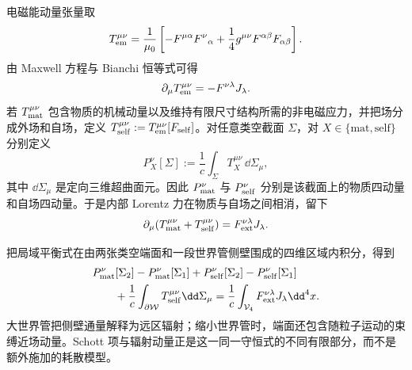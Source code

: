 \begin{proposition}[物质与自场的局域守恒]
电磁能动量张量取
\begin{equation}
 T_{\rm em}^{\mu\nu}
 =\frac1{\mu_0}
 \left[-F^{\mu\alpha}F^\nu{}_{\alpha}
 +\frac14g^{\mu\nu}F^{\alpha\beta}F_{\alpha\beta}\right].
 \label{eq:phys-rr-em-stress-energy}
\end{equation}
由 Maxwell 方程与 Bianchi 恒等式可得
\[
 \partial_\mu T_{\rm em}^{\mu\nu}=-F^{\nu\lambda}J_\lambda.
\]
若 \(T_{\rm mat}^{\mu\nu}\) 包含物质的机械动量以及维持有限尺寸结构所需的非电磁应力，并把场分成外场和自场，定义 \(T_{\rm self}^{\mu\nu}:=T_{\rm em}^{\mu\nu}[F_{\rm self}]\)。对任意类空截面 \(\Sigma\)，对 \(X\in\{\mathrm{mat},\mathrm{self}\}\) 分别定义
\[
 P_X^{\nu}[\Sigma]
 :=\frac1c\int_{\Sigma}T_X^{\mu\nu}\,\dd\Sigma_\mu,
\]
其中 \(\dd\Sigma_\mu\) 是定向三维超曲面元。因此 \(P_{\rm mat}^{\nu}\) 与 \(P_{\rm self}^{\nu}\) 分别是该截面上的物质四动量和自场四动量。于是内部 Lorentz 力在物质与自场之间相消，留下
\begin{equation}
 \partial_\mu\!
 \left(T_{\rm mat}^{\mu\nu}+T_{\rm self}^{\mu\nu}\right)
 =F_{\rm ext}^{\nu\lambda}J_\lambda .
 \label{eq:phys-rr-exact-self-balance}
\end{equation}
\end{proposition}
把局域平衡式在由两张类空端面和一段世界管侧壁围成的四维区域内积分，得到
\begin{align}
 &P_{\rm mat}^\nu[\Sigma_2]-P_{\rm mat}^\nu[\Sigma_1]
 +P_{\rm self}^\nu[\Sigma_2]-P_{\rm self}^\nu[\Sigma_1]\notag\\
 &\qquad
 +\frac1c\int_{\partial\mathcal W}T_{\rm self}^{\mu\nu}\dd\Sigma_\mu
 =\frac1c\int_{\mathcal V_4} F_{\rm ext}^{\nu\lambda}J_\lambda\dd^4x .
 \label{eq:phys-rr-worldtube-general-balance}
\end{align}
大世界管把侧壁通量解释为远区辐射；缩小世界管时，端面还包含随粒子运动的束缚近场动量。Schott 项与辐射动量正是这一同一守恒式的不同有限部分，而不是额外施加的耗散模型。

